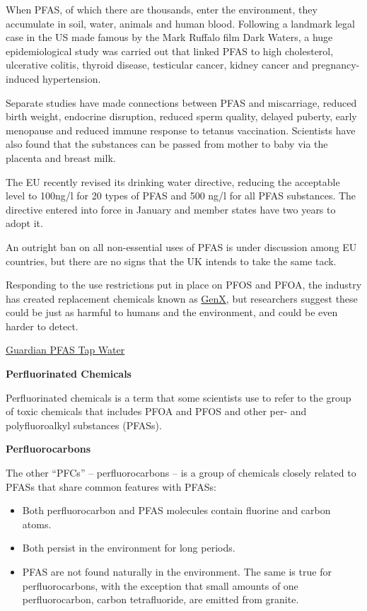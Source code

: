 \documentclass[
]{book}
\providecommand{\tightlist}{%
  \setlength{\itemsep}{0pt}\setlength{\parskip}{0pt}}
\begin{document}
When PFAS, of which there are thousands, enter the environment, they accumulate in soil, water, animals and human blood. Following a landmark legal case in the US made famous by the Mark Ruffalo film Dark Waters, a huge epidemiological study was carried out that linked PFAS to high cholesterol, ulcerative colitis, thyroid disease, testicular cancer, kidney cancer and pregnancy-induced hypertension.

Separate studies have made connections between PFAS and miscarriage, reduced birth weight, endocrine disruption, reduced sperm quality, delayed puberty, early menopause and reduced immune response to tetanus vaccination. Scientists have also found that the substances can be passed from mother to baby via the placenta and breast milk.

The EU recently revised its drinking water directive, reducing the acceptable level to 100ng/l for 20 types of PFAS and 500 ng/l for all PFAS substances. The directive entered into force in January and member states have two years to adopt it.

An outright ban on all non-essential uses of PFAS is under discussion among EU countries, but there are no signs that the UK intends to take the same tack.

Responding to the use restrictions put in place on PFOS and PFOA, the industry has created replacement chemicals known as \href{https://www.endsreport.com/article/1589354/pfoa-replacement-deemed-substance-high-concern}{GenX}, but researchers suggest these could be just as harmful to humans and the environment, and could be even harder to detect.

\href{https://www.theguardian.com/environment/2021/mar/25/uk-flying-blind-on-levels-of-toxic-chemicals-in-tap-water}{Guardian PFAS Tap Water}

\textbf{Perfluorinated Chemicals}

Perfluorinated chemicals is a term that some scientists use to refer to the group of toxic chemicals that includes PFOA and PFOS and other per- and polyfluoroalkyl substances (PFASs).

\textbf{Perfluorocarbons}

The other ``PFCs'' -- perfluorocarbons --
is a group of chemicals closely related to PFASs that share common features with PFASs:

\begin{itemize}
\tightlist
\item
  Both perfluorocarbon and PFAS molecules contain fluorine and carbon atoms.
\item
  Both persist in the environment for long periods.
\item
  PFAS are not found naturally in the environment. The same is true for perfluorocarbons, with the exception that small amounts of one perfluorocarbon, carbon tetrafluoride, are emitted from granite.
\end{itemize}
\end{document}
